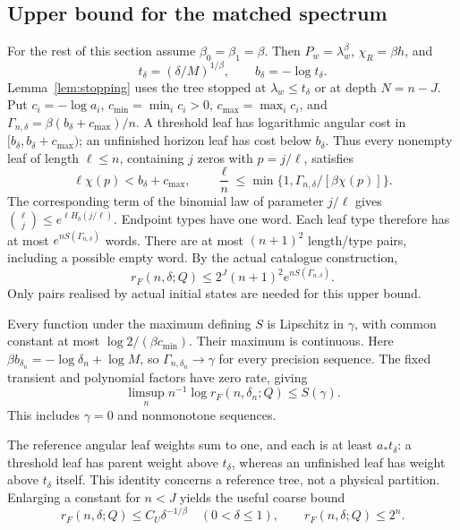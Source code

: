 \documentclass[11pt]{amsart}
\theoremstyle{definition}
\theoremstyle{remark}
\numberwithin{equation}{section}
\begin{document}
\subsection{Upper bound for the matched spectrum}
For the rest of this section assume $\beta_0=\beta_1=\beta$.
Then $P_w=\lambda_w^\beta$, $\chi_R=\beta h$, and
\[
t_\delta=(\delta/M)^{1/\beta},\qquad b_\delta=-\log t_\delta.
\]
Lemma~\ref{lem:stopping} uses the tree stopped at
$\lambda_w\le t_\delta$ or at depth $N=n-J$.
Put $c_i=-\log a_i$, $c_{\min}=\min_i c_i>0$,
$c_{\max}=\max_i c_i$, and
$\Gamma_{n,\delta}=\beta(b_\delta+c_{\max})/n$.
A threshold leaf has logarithmic angular cost in
$[b_\delta,b_\delta+c_{\max})$; an unfinished horizon leaf
has cost below $b_\delta$. Thus every nonempty leaf of length
$\ell\le n$, containing $j$ zeros with $p=j/\ell$, satisfies
\begin{equation}\label{eq:leafcost}
\ell\chi(p)<b_\delta+c_{\max},\qquad
\frac{\ell}{n}\le
       \min\{1,\Gamma_{n,\delta}/[\beta\chi(p)]\}.
\end{equation}
The corresponding term of the binomial law of parameter $j/\ell$
gives $\binom{\ell}{j}\le e^{\ell H_b(j/\ell)}$.
Endpoint types have one word. Each leaf type therefore has at most
$e^{nS(\Gamma_{n,\delta})}$ words. There are at most $(n+1)^2$
length/type pairs, including a possible empty word. By the actual
catalogue construction,
\begin{equation}\label{eq:treeupper}
r_F(n,\delta;Q)\le 2^J(n+1)^2e^{nS(\Gamma_{n,\delta})}.
\end{equation}
Only pairs realised by actual initial states are needed for this
upper bound.

Every function under the maximum defining $S$ is Lipschitz in
$\gamma$, with common constant at most
$\log2/(\beta c_{\min})$. Their maximum is continuous.
Here $\beta b_{\delta_n}=-\log\delta_n+\log M$, so
$\Gamma_{n,\delta_n}\to\gamma$ for every precision sequence.
The fixed transient and polynomial factors have zero rate, giving
\begin{equation}\label{eq:spectrumupper}
\limsup_n n^{-1}\log r_F(n,\delta_n;Q)\le S(\gamma).
\end{equation}
This includes $\gamma=0$ and nonmonotone sequences.

The reference angular leaf weights sum to one, and each is at least
$a_*t_\delta$: a threshold leaf has parent weight above $t_\delta$,
whereas an unfinished leaf has weight above $t_\delta$ itself.
This identity concerns a reference tree, not a physical partition.
Enlarging a constant for $n<J$ yields the useful coarse bound
\begin{equation}\label{eq:upper}
r_F(n,\delta;Q)\le C_U\delta^{-1/\beta}
       \quad(0<\delta\le1),\qquad r_F(n,\delta;Q)\le2^n .
\end{equation}
\end{document}

